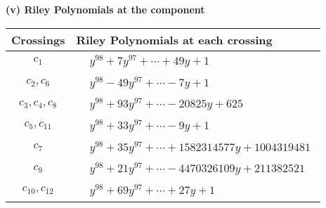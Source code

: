 \documentclass[1p]{elsarticle_modified}
\theoremstyle{definition}
\begin{document}
\flushleft \textbf{(v) Riley Polynomials at the component}\newline \\
\begin{tabular}{m{50pt}|m{274pt}}
Crossings & \hspace{64pt}Riley Polynomials at each crossing \\
\hline $$\begin{aligned}c_{1}\end{aligned}$$&$\begin{aligned}
&y^{98}+7 y^{97}+\cdots+49 y+1
\end{aligned}$\\
\hline $$\begin{aligned}c_{2},c_{6}\end{aligned}$$&$\begin{aligned}
&y^{98}-49 y^{97}+\cdots-7 y+1
\end{aligned}$\\
\hline $$\begin{aligned}c_{3},c_{4},c_{8}\end{aligned}$$&$\begin{aligned}
&y^{98}+93 y^{97}+\cdots-20825 y+625
\end{aligned}$\\
\hline $$\begin{aligned}c_{5},c_{11}\end{aligned}$$&$\begin{aligned}
&y^{98}+33 y^{97}+\cdots-9 y+1
\end{aligned}$\\
\hline $$\begin{aligned}c_{7}\end{aligned}$$&$\begin{aligned}
&y^{98}+35 y^{97}+\cdots+1582314577 y+1004319481
\end{aligned}$\\
\hline $$\begin{aligned}c_{9}\end{aligned}$$&$\begin{aligned}
&y^{98}+21 y^{97}+\cdots-4470326109 y+211382521
\end{aligned}$\\
\hline $$\begin{aligned}c_{10},c_{12}\end{aligned}$$&$\begin{aligned}
&y^{98}+69 y^{97}+\cdots+27 y+1
\end{aligned}$\\
\hline
\end{tabular}\\~\\
\end{document}
